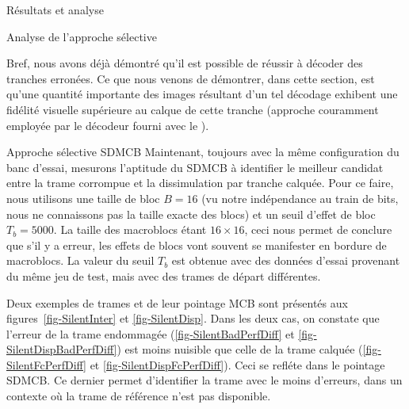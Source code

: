 \begin{chapter}{Résultats et analyse}
\begin{section}{Analyse de l'approche sélective}

Bref, nous avons déjà démontré qu'il est possible de réussir à décoder des
tranches erronées. Ce que nous venons de démontrer, dans cette section, est
qu'une quantité importante des images résultant d'un tel décodage exhibent une
fidélité visuelle supérieure au calque de cette tranche (approche couramment
employée par le décodeur fourni avec le \ltCodec).

\FloatBarrier
\begin{subsection}{Approche sélective SDMCB} \label{sec-AnalyseSDMCB}
Maintenant, toujours avec la même configuration du banc d'essai, mesurons
l'aptitude du SDMCB à identifier le meilleur candidat entre la trame corrompue
et la dissimulation par tranche calquée. Pour ce faire, nous utilisons une
taille de bloc $B=16$ (vu notre indépendance au train de bits, nous ne
connaissons pas la taille exacte des blocs) et un seuil d'effet de bloc $T_b =
5000$. La taille des macroblocs étant $16\times 16$, ceci nous permet de
conclure que s'il y a erreur, les effets de blocs vont souvent se manifester en
bordure de macroblocs. La valeur du seuil $T_b$ est obtenue avec des données
d'essai provenant du même jeu de test, mais avec des trames de départ
différentes.

Deux exemples de trames et de leur pointage MCB sont présentés aux
figures~\ref{fig-SilentInter} et \ref{fig-SilentDisp}. Dans les deux cas, on
constate que l'erreur de la trame endommagée (\ref{fig-SilentBadPerfDiff} et
\ref{fig-SilentDispBadPerfDiff}) est moins nuisible que celle de la trame
calquée (\ref{fig-SilentFcPerfDiff} et \ref{fig-SilentDispFcPerfDiff}). Ceci se
refléte dans le pointage SDMCB. Ce dernier permet d'identifier la trame avec le
moins d'erreurs, dans un contexte où la trame de référence n'est pas disponible.


\end{subsection}
\end{section}
\end{chapter}
